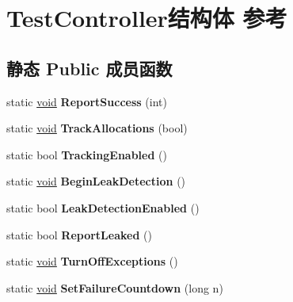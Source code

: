 \hypertarget{struct_test_controller}{}\section{Test\+Controller结构体 参考}
\label{struct_test_controller}
\subsection*{静态 Public 成员函数}
\begin{DoxyCompactItemize}
\item 
\mbox{\label{struct_test_controller_ad3d8033965448489c4fba0eb6a6721b4}} 
static \hyperlink{interfacevoid}{void} {\bfseries Report\+Success} (int)
\item 
\mbox{\label{struct_test_controller_a2c5e672752e9c6a51971237162aa5f94}} 
static \hyperlink{interfacevoid}{void} {\bfseries Track\+Allocations} (bool)
\item 
\mbox{\label{struct_test_controller_ab0c777ab77cd7706ce48cbdd8efb5da7}} 
static bool {\bfseries Tracking\+Enabled} ()
\item 
\mbox{\label{struct_test_controller_a1b48e731f414cc7ec8b5502ee0f62267}} 
static \hyperlink{interfacevoid}{void} {\bfseries Begin\+Leak\+Detection} ()
\item 
\mbox{\label{struct_test_controller_ab63e35894e1c88aca4c8a353aaae0b5b}} 
static bool {\bfseries Leak\+Detection\+Enabled} ()
\item 
\mbox{\label{struct_test_controller_a21e7b04f7769c6f8e1abd227a1d08743}} 
static bool {\bfseries Report\+Leaked} ()
\item 
\mbox{\label{struct_test_controller_ad446623a3393ccca81d2c22969e89074}} 
static \hyperlink{interfacevoid}{void} {\bfseries Turn\+Off\+Exceptions} ()
\item 
\mbox{\label{struct_test_controller_aabced683344d2eb2c622daed7ac05ac0}} 
static \hyperlink{interfacevoid}{void} {\bfseries Set\+Failure\+Countdown} (long n)

\end{DoxyCompactItemize}
